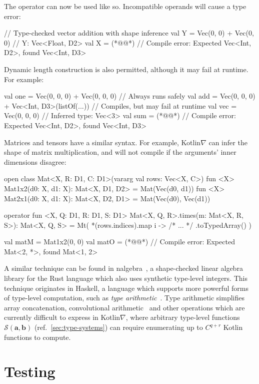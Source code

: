 %
The operator \inline{+} can now be used like so. Incompatible operands will cause a type error:
%
\begin{kotlinlisting}
// Type-checked vector addition with shape inference
val Y = Vec(0, 0) + Vec(0, 0) // Y: Vec<Float, D2>
val X = (*@@*) // Compile error: Expected Vec<Int, D2>, found Vec<Int, D3>
\end{kotlinlisting}
%
Dynamic length construction is also permitted, although it may fail at runtime. For example:
%
\begin{kotlinlisting}
val one = Vec(0, 0, 0) + Vec(0, 0, 0) // Always runs safely
val add = Vec(0, 0, 0) + Vec<Int, D3>(listOf(...)) // Compiles, but may fail at runtime
val vec = Vec(0, 0, 0) // Inferred type: Vec<3>
val sum = (*@@*) // Compile error: Expected Vec<Int, D2>, found Vec<Int, D3>
\end{kotlinlisting}
%
Matrices and tensors have a similar syntax. For example, Kotlin$\nabla$ can infer the shape of matrix multiplication, and will not compile if the arguments' inner dimensions disagree:
%
\begin{kotlinlisting}
open class Mat<X, R: D1, C: D1>(vararg val rows: Vec<X, C>)
fun <X> Mat1x2(d0: X, d1: X): Mat<X, D1, D2> = Mat(Vec(d0, d1))
fun <X> Mat2x1(d0: X, d1: X): Mat<X, D2, D1> = Mat(Vec(d0), Vec(d1))

operator fun <X, Q: D1, R: D1, S: D1> Mat<X, Q, R>.times(m: Mat<X, R, S>): Mat<X, Q, S> =
    Mt( *(rows.indices).map { i -> /* ... */ }.toTypedArray() )

val matM = Mat1x2(0, 0)
val matO = (*@@*) // Compile error: Expected Mat<2, *>, found Mat<1, 2>
\end{kotlinlisting}
%
A similar technique can be found in nalgebra~\citep{crozet2019nalgebra}, a shape-checked linear algebra library for the Rust language which also uses synthetic type-level integers. This technique originates in Haskell, a language which supports more powerful forms of type-level computation, such as \textit{type arithmetic}~\citep{kiselyov2005number}. Type arithmetic simplifies array concatenation, convolutional arithmetic~\citep{dumoulin2016guide} and other operations which are currently difficult to express in Kotlin$\nabla$, where arbitrary type-level functions $\mathcal{S}(\mathbf a, \mathbf b)$ (ref.~\autoref{sec:type-systems}) can require enumerating up to $C^{q + r}$ Kotlin functions to compute.

\section{Testing}\label{sec:testing}

